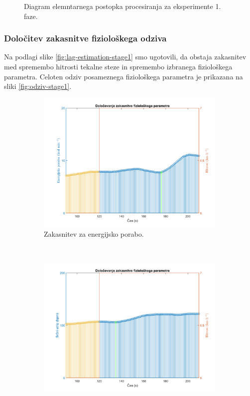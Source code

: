 \begin{figure}[htb]
	\centering
	
	\caption{Diagram elemntarnega postopka procesiranja za eksperimente 1. faze.}
	\label{fig:diagram-procesiranja-stage1}
\end{figure}

\subsubsection{Določitev zakasnitve fiziološkega odziva}
Na podlagi slike \ref{fig:lag-estimation-stage1} smo ugotovili, da obstaja zakasnitev med spremembo hitrosti tekalne steze in spremembo izbranega fiziološkega parametra. Celoten odziv posameznega fiziološkega parametra je prikazana na sliki \ref{fig:odziv-stage1}.


\begin{figure}[!htb]
	\centering
	\begin{subfigure}[t]{0.45\columnwidth}
		\includegraphics[width=\columnwidth]{./Slike/lag-estimation-train-eem.png}
		\caption{Zakasnitev za energijsko porabo.}
		\label{fig:lag-estimation-train-eem}
	\end{subfigure}
	~
	\begin{subfigure}[t]{0.45\columnwidth}
		\includegraphics[width=\columnwidth]{./Slike/lag-estimation-train-hr.png}

\end{subfigure}
\end{figure}
